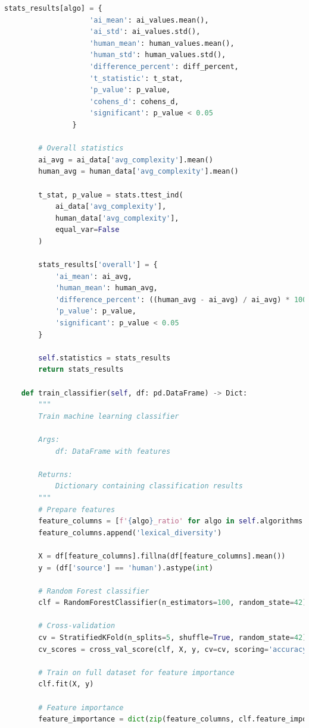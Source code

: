 \documentclass[12pt,a4paper]{report}
\begin{document}
\begin{lstlisting}[language=Python, caption=Complete Compression Analysis Framework]
                stats_results[algo] = {
                    'ai_mean': ai_values.mean(),
                    'ai_std': ai_values.std(),
                    'human_mean': human_values.mean(),
                    'human_std': human_values.std(),
                    'difference_percent': diff_percent,
                    't_statistic': t_stat,
                    'p_value': p_value,
                    'cohens_d': cohens_d,
                    'significant': p_value < 0.05
                }

        # Overall statistics
        ai_avg = ai_data['avg_complexity'].mean()
        human_avg = human_data['avg_complexity'].mean()

        t_stat, p_value = stats.ttest_ind(
            ai_data['avg_complexity'],
            human_data['avg_complexity'],
            equal_var=False
        )

        stats_results['overall'] = {
            'ai_mean': ai_avg,
            'human_mean': human_avg,
            'difference_percent': ((human_avg - ai_avg) / ai_avg) * 100,
            'p_value': p_value,
            'significant': p_value < 0.05
        }

        self.statistics = stats_results
        return stats_results

    def train_classifier(self, df: pd.DataFrame) -> Dict:
        """
        Train machine learning classifier

        Args:
            df: DataFrame with features

        Returns:
            Dictionary containing classification results
        """
        # Prepare features
        feature_columns = [f'{algo}_ratio' for algo in self.algorithms if f'{algo}_ratio' in df.columns]
        feature_columns.append('lexical_diversity')

        X = df[feature_columns].fillna(df[feature_columns].mean())
        y = (df['source'] == 'human').astype(int)

        # Random Forest classifier
        clf = RandomForestClassifier(n_estimators=100, random_state=42)

        # Cross-validation
        cv = StratifiedKFold(n_splits=5, shuffle=True, random_state=42)
        cv_scores = cross_val_score(clf, X, y, cv=cv, scoring='accuracy')

        # Train on full dataset for feature importance
        clf.fit(X, y)

        # Feature importance
        feature_importance = dict(zip(feature_columns, clf.feature_importances_))


\end{lstlisting}
\end{document}
